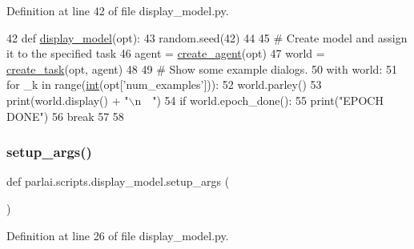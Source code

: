 Definition at line 42 of file display\+\_\+model.\+py.


\begin{DoxyCode}
42 \textcolor{keyword}{def }\hyperlink{namespaceparlai_1_1scripts_1_1display__model_a25488b354b0b8cbaee28b146b17c26f1}{display\_model}(opt):
43     random.seed(42)
44 
45     \textcolor{comment}{# Create model and assign it to the specified task}
46     agent = \hyperlink{namespaceparlai_1_1core_1_1agents_a00d77a7e26fb89e8bd900f7b2a02982a}{create\_agent}(opt)
47     world = \hyperlink{namespaceparlai_1_1core_1_1worlds_a79969c7ba76d4b3c500f5bb776444dc6}{create\_task}(opt, agent)
48 
49     \textcolor{comment}{# Show some example dialogs.}
50     with world:
51         \textcolor{keywordflow}{for} \_k \textcolor{keywordflow}{in} range(\hyperlink{namespacelanguage__model_1_1eval__ppl_a7d12ee00479673c5c8d1f6d01faa272a}{int}(opt[\textcolor{stringliteral}{'num\_examples'}])):
52             world.parley()
53             print(world.display() + \textcolor{stringliteral}{"\(\backslash\)n~~"})
54             \textcolor{keywordflow}{if} world.epoch\_done():
55                 print(\textcolor{stringliteral}{"EPOCH DONE"})
56                 \textcolor{keywordflow}{break}
57 
58 
\end{DoxyCode}
\mbox{\label{namespaceparlai_1_1scripts_1_1display__model_a9141f8dde0f690b4d641fe08c193e2b5}} 
\subsubsection{\texorpdfstring{setup\+\_\+args()}{setup\_args()}}
{\footnotesize\ttfamily def parlai.\+scripts.\+display\+\_\+model.\+setup\+\_\+args (\begin{DoxyParamCaption}{ }\end{DoxyParamCaption})}



Definition at line 26 of file display\+\_\+model.\+py.


